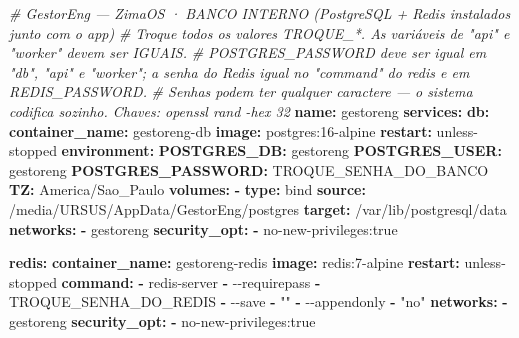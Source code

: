 \documentclass[
  10pt,
]{article}
\newenvironment{Shaded}{\begin{snugshade}}{\end{snugshade}}
\newcommand{\AttributeTok}[1]{\textcolor[rgb]{0.13,0.29,0.53}{#1}}
\newcommand{\CommentTok}[1]{\textcolor[rgb]{0.56,0.35,0.01}{\textit{#1}}}
\newcommand{\FunctionTok}[1]{\textcolor[rgb]{0.13,0.29,0.53}{\textbf{#1}}}
\newcommand{\KeywordTok}[1]{\textcolor[rgb]{0.13,0.29,0.53}{\textbf{#1}}}
\newcommand{\StringTok}[1]{\textcolor[rgb]{0.31,0.60,0.02}{#1}}
\begin{document}
\begin{Shaded}
\begin{Highlighting}[]
\CommentTok{\# GestorEng — ZimaOS · BANCO INTERNO (PostgreSQL + Redis instalados junto com o app)}
\CommentTok{\# Troque todos os valores TROQUE\_*. As variáveis de "api" e "worker" devem ser IGUAIS.}
\CommentTok{\# POSTGRES\_PASSWORD deve ser igual em "db", "api" e "worker"; a senha do Redis igual no "command" do redis e em REDIS\_PASSWORD.}
\CommentTok{\# Senhas podem ter qualquer caractere — o sistema codifica sozinho. Chaves: openssl rand {-}hex 32}
\FunctionTok{name}\KeywordTok{:}\AttributeTok{ gestoreng}
\FunctionTok{services}\KeywordTok{:}
\AttributeTok{  }\FunctionTok{db}\KeywordTok{:}
\AttributeTok{    }\FunctionTok{container\_name}\KeywordTok{:}\AttributeTok{ gestoreng{-}db}
\AttributeTok{    }\FunctionTok{image}\KeywordTok{:}\AttributeTok{ postgres:16{-}alpine}
\AttributeTok{    }\FunctionTok{restart}\KeywordTok{:}\AttributeTok{ unless{-}stopped}
\AttributeTok{    }\FunctionTok{environment}\KeywordTok{:}
\AttributeTok{      }\FunctionTok{POSTGRES\_DB}\KeywordTok{:}\AttributeTok{ gestoreng}
\AttributeTok{      }\FunctionTok{POSTGRES\_USER}\KeywordTok{:}\AttributeTok{ gestoreng}
\AttributeTok{      }\FunctionTok{POSTGRES\_PASSWORD}\KeywordTok{:}\AttributeTok{ TROQUE\_SENHA\_DO\_BANCO}
\AttributeTok{      }\FunctionTok{TZ}\KeywordTok{:}\AttributeTok{ America/Sao\_Paulo}
\AttributeTok{    }\FunctionTok{volumes}\KeywordTok{:}
\AttributeTok{      }\KeywordTok{{-}}\AttributeTok{ }\FunctionTok{type}\KeywordTok{:}\AttributeTok{ bind}
\AttributeTok{        }\FunctionTok{source}\KeywordTok{:}\AttributeTok{ /media/URSUS/AppData/GestorEng/postgres}
\AttributeTok{        }\FunctionTok{target}\KeywordTok{:}\AttributeTok{ /var/lib/postgresql/data}
\AttributeTok{    }\FunctionTok{networks}\KeywordTok{:}
\AttributeTok{      }\KeywordTok{{-}}\AttributeTok{ gestoreng}
\AttributeTok{    }\FunctionTok{security\_opt}\KeywordTok{:}
\AttributeTok{      }\KeywordTok{{-}}\AttributeTok{ no{-}new{-}privileges:true}

\AttributeTok{  }\FunctionTok{redis}\KeywordTok{:}
\AttributeTok{    }\FunctionTok{container\_name}\KeywordTok{:}\AttributeTok{ gestoreng{-}redis}
\AttributeTok{    }\FunctionTok{image}\KeywordTok{:}\AttributeTok{ redis:7{-}alpine}
\AttributeTok{    }\FunctionTok{restart}\KeywordTok{:}\AttributeTok{ unless{-}stopped}
\AttributeTok{    }\FunctionTok{command}\KeywordTok{:}
\AttributeTok{      }\KeywordTok{{-}}\AttributeTok{ redis{-}server}
\AttributeTok{      }\KeywordTok{{-}}\AttributeTok{ {-}{-}requirepass}
\AttributeTok{      }\KeywordTok{{-}}\AttributeTok{ TROQUE\_SENHA\_DO\_REDIS}
\AttributeTok{      }\KeywordTok{{-}}\AttributeTok{ {-}{-}save}
\AttributeTok{      }\KeywordTok{{-}}\AttributeTok{ }\StringTok{""}
\AttributeTok{      }\KeywordTok{{-}}\AttributeTok{ {-}{-}appendonly}
\AttributeTok{      }\KeywordTok{{-}}\AttributeTok{ }\StringTok{"no"}
\AttributeTok{    }\FunctionTok{networks}\KeywordTok{:}
\AttributeTok{      }\KeywordTok{{-}}\AttributeTok{ gestoreng}
\AttributeTok{    }\FunctionTok{security\_opt}\KeywordTok{:}
\AttributeTok{      }\KeywordTok{{-}}\AttributeTok{ no{-}new{-}privileges:true}


\end{Highlighting}
\end{Shaded}
\end{document}
